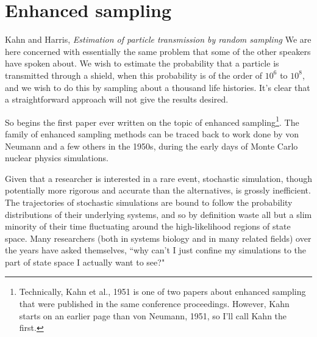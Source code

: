 


\section{Enhanced sampling}

\begin{chapquote}{Kahn and Harris, \textit{Estimation of particle transmission by random sampling}\supercite{Kahn:1951es}}
We are here concerned with essentially the same problem that some of the other speakers have spoken about. We wish to estimate the probability that a particle is transmitted through a shield, when this probability is of the order of $10^6$ to $10^8$, and we wish to do this by sampling about a thousand life histories. It's clear that a straightforward approach will not give the results desired.
\end{chapquote}

So begins the first paper ever written on the topic of enhanced sampling\footnote{Technically, Kahn et al., 1951\supercite{Kahn:1951es} is one of two papers about enhanced sampling that were published in the same conference proceedings. However, Kahn starts on an earlier page than von Neumann, 1951\supercite{vonNeumann:1951fe}, so I'll call Kahn the first.}. The family of enhanced sampling methods can be traced back to work done by von Neumann\supercite{vonNeumann:1951fe} and a few others\supercite{Kahn:1953az,Forsythe:1972cf} in the 1950s, during the early days of Monte Carlo nuclear physics simulations.

Given that a researcher is interested in a rare event, stochastic simulation, though potentially more rigorous and accurate than the alternatives, is grossly inefficient. The trajectories of stochastic simulations are bound to follow the probability distributions of their underlying systems, and so by definition waste all but a slim minority of their time fluctuating around the high-likelihood regions of state space. Many researchers (both in systems biology and in many related fields\supercite{Huber:1996dn,Dellago:1998kw,vanErp:2005jua,Bernardi:2015ij}) over the years have asked themselves, ``why can't I just confine my simulations to the part of state space I actually want to see?"

